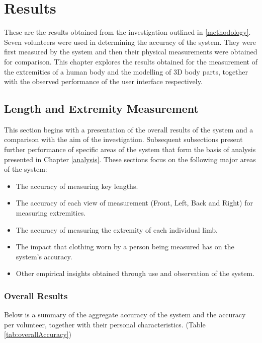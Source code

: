 \chapter{Results} \label{results}
These are the results obtained from the investigation outlined in \ref{methodology}. Seven volunteers were used in determining the accuracy of the system. They were first measured by the system and then their physical measurements were obtained for comparison. This chapter explores the results obtained for the measurement of the extremities of a human body and the modelling of 3D body parts, together with the observed performance of the user interface respectively.

\section{Length and Extremity Measurement}

This section begins with a presentation of the overall results of the system and a comparison with the aim of the investigation. Subsequent subsections present further performance of specific areas of the system that form the basis of analysis presented in Chapter \ref{analysis}. These sections focus on the following major areas of the system:

\begin{itemize}
	\item The accuracy of measuring key lengths.
	\item The accuracy of each view of measurement (Front, Left, Back and Right) for measuring extremities.
	\item The accuracy of measuring the extremity of each individual limb.
	\item The impact that clothing worn by a person being measured has on the system's accuracy.
	\item Other empirical insights obtained through use and observation of the system. 
\end{itemize}


\subsection{Overall Results}
Below is a summary of the aggregate accuracy of the system and the accuracy per volunteer, together with their personal characteristics. (Table \ref{tab:overallAccuracy})
 

